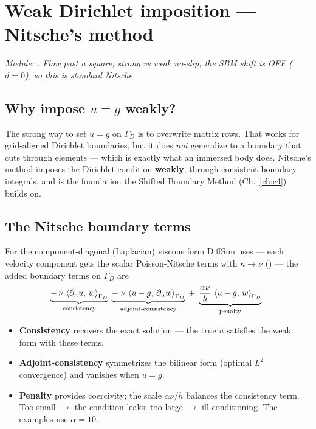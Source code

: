 \chapter{Weak Dirichlet imposition --- Nitsche's method}
\label{ch:c3}

\emph{Module: . Flow past a square;
strong vs weak no-slip; the SBM shift is OFF ($d=0$), so this is standard
Nitsche.}

\section{Why impose $u=g$ weakly?}
The strong way to set $u=g$ on $\Gamma_D$ is to overwrite matrix rows. That
works for grid-aligned Dirichlet boundaries, but it does \emph{not}
generalize to a boundary that cuts through elements --- which is exactly
what an immersed body does. Nitsche's method imposes the Dirichlet
condition \textbf{weakly}, through consistent boundary integrals, and is the
foundation the Shifted Boundary Method (Ch.~\ref{ch:c4}) builds on.

\section{The Nitsche boundary terms}
For the component-diagonal (Laplacian) viscous form DiffSim uses --- each
velocity component gets the scalar Poisson-Nitsche terms with
$\kappa\to\nu$ () --- the added boundary terms on
$\Gamma_D$ are
\begin{equation}
\underbrace{-\,\nu\,\left\langle \partial_n u,\,w\right\rangle_{\Gamma_D}}_{\text{consistency}}
\;\underbrace{-\;\nu\,\left\langle u-g,\,\partial_n w\right\rangle_{\Gamma_D}}_{\text{adjoint-consistency}}
\;+\;\underbrace{\frac{\alpha\nu}{h}\,\left\langle u-g,\,w\right\rangle_{\Gamma_D}}_{\text{penalty}}.
\end{equation}
\begin{itemize}
\item \textbf{Consistency} recovers the exact solution --- the true $u$
  satisfies the weak form with these terms.
\item \textbf{Adjoint-consistency} symmetrizes the bilinear form (optimal
  $L^2$ convergence) and vanishes when $u=g$.
\item \textbf{Penalty} provides coercivity; the scale $\alpha\nu/h$
  balances the consistency term. Too small $\to$ the condition leaks; too
  large $\to$ ill-conditioning. The examples use $\alpha=10$.
\end{itemize}

